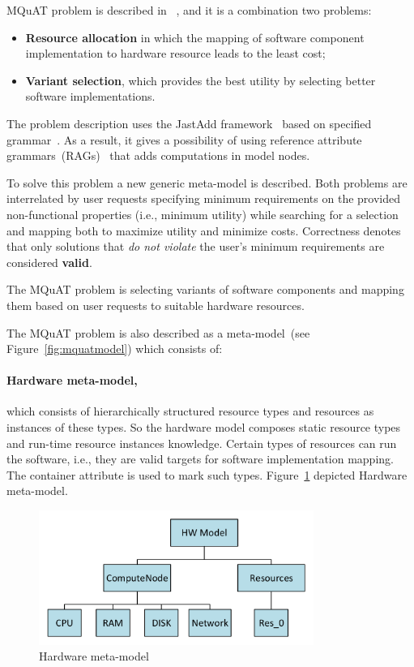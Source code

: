 MQuAT problem is described in ~\cite{gotz18}, and it is a combination two problems:

\begin{itemize}
	\item \textbf{Resource allocation} in which the mapping of software component implementation to hardware resource leads to the least cost;
	\item \textbf{Variant selection}, which provides the best utility by selecting better software implementations.
\end{itemize} 

The problem description uses the JastAdd framework~\cite{ekman07} based on specified grammar~\cite{gotz2018JastAdd}. As a result, it gives a possibility of using reference attribute grammars~(RAGs)~\cite{hedin2000} that adds computations in model nodes.

To solve this problem a new generic meta-model is described. Both problems are interrelated by user requests specifying minimum requirements on the provided non-functional properties (i.e., minimum utility) while searching for a selection and mapping both to maximize utility and minimize costs. Correctness denotes that only solutions that \textit{do not violate} the user's minimum requirements are considered \textbf{valid}.

The MQuAT problem is selecting variants of software components and mapping them based on user requests to suitable hardware resources.


The MQuAT problem is also described as a meta-model~(see Figure~\ref{fig:mquatmodel}) which consists of:
\paragraph{Hardware meta-model,}which consists of hierarchically structured resource types and resources as instances of these types. So the hardware model composes static resource types and run-time resource instances knowledge. Certain types of resources can run the software, i.e., they are valid targets for software implementation mapping. The container attribute is used to mark such types. Figure~\ref{fig:HWmodel} depicted Hardware meta-model.

\begin{figure}
	\centering
	\includegraphics[width=0.8\textwidth]{images/HWModel.pdf}
	\caption[Hardware meta-model]{Hardware meta-model}
	\label{fig:HWmodel}
\end{figure}


